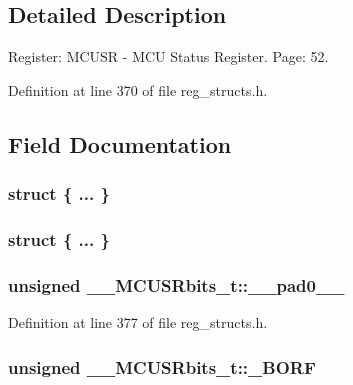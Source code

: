 \subsection{Detailed Description}
Register\+: M\+C\+U\+S\+R -\/ M\+C\+U Status Register. Page\+: 52. 

Definition at line 370 of file reg\+\_\+structs.\+h.



\subsection{Field Documentation}
\hypertarget{union_____m_c_u_s_rbits__t_a8d383171aef91686a759c5af63b80062}{\subsubsection[{"@89}]{\setlength{\rightskip}{0pt plus 5cm}struct \{ ... \} }}\label{union_____m_c_u_s_rbits__t_a8d383171aef91686a759c5af63b80062}
\hypertarget{union_____m_c_u_s_rbits__t_a03374ce75b8f9be52ef8385715a03960}{\subsubsection[{"@91}]{\setlength{\rightskip}{0pt plus 5cm}struct \{ ... \} }}\label{union_____m_c_u_s_rbits__t_a03374ce75b8f9be52ef8385715a03960}
\hypertarget{union_____m_c_u_s_rbits__t_a24672c1bbffdf8d6b9ce3ab66a7b375e}{
\subsubsection[{\+\_\+\+\_\+pad0\+\_\+\+\_\+}]{\setlength{\rightskip}{0pt plus 5cm}unsigned \+\_\+\+\_\+\+M\+C\+U\+S\+Rbits\+\_\+t\+::\+\_\+\+\_\+pad0\+\_\+\+\_\+}}\label{union_____m_c_u_s_rbits__t_a24672c1bbffdf8d6b9ce3ab66a7b375e}


Definition at line 377 of file reg\+\_\+structs.\+h.

\hypertarget{union_____m_c_u_s_rbits__t_aa4487a42abfcea28d395b6e0b66738d4}{
\subsubsection[{\+\_\+\+B\+O\+R\+F}]{\setlength{\rightskip}{0pt plus 5cm}unsigned \+\_\+\+\_\+\+M\+C\+U\+S\+Rbits\+\_\+t\+::\+\_\+\+B\+O\+R\+F}}\label{union_____m_c_u_s_rbits__t_aa4487a42abfcea28d395b6e0b66738d4}


